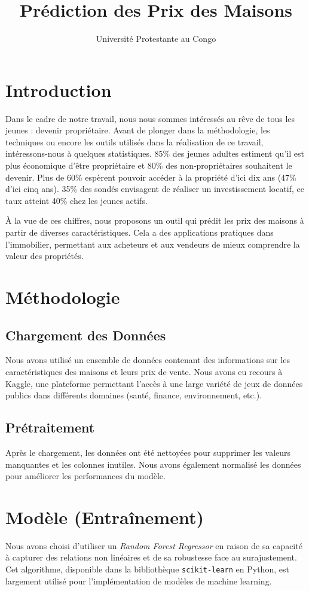 \documentclass{article}
\title{Prédiction des Prix des Maisons}
\author{Université Protestante au Congo}
\date{}
\begin{document}
 
\maketitle
 
\section{Introduction}
Dans le cadre de notre travail, nous nous sommes intéressés au rêve de tous les jeunes : devenir propriétaire. Avant de plonger dans la méthodologie, les techniques ou encore les outils utilisés dans la réalisation de ce travail, intéressons-nous à quelques statistiques. 85\% des jeunes adultes estiment qu’il est plus économique d’être propriétaire et 80\% des non-propriétaires souhaitent le devenir. Plus de 60\% espèrent pouvoir accéder à la propriété d’ici dix ans (47\% d’ici cinq ans). 35\% des sondés envisagent de réaliser un investissement locatif, ce taux atteint 40\% chez les jeunes actifs.
 
À la vue de ces chiffres, nous proposons un outil qui prédit les prix des maisons à partir de diverses caractéristiques. Cela a des applications pratiques dans l'immobilier, permettant aux acheteurs et aux vendeurs de mieux comprendre la valeur des propriétés.
 
\section{Méthodologie}
 
\subsection{Chargement des Données}
Nous avons utilisé un ensemble de données contenant des informations sur les caractéristiques des maisons et leurs prix de vente. Nous avons eu recours à Kaggle, une plateforme permettant l’accès à une large variété de jeux de données publics dans différents domaines (santé, finance, environnement, etc.).
 
\subsection{Prétraitement}
Après le chargement, les données ont été nettoyées pour supprimer les valeurs manquantes et les colonnes inutiles. Nous avons également normalisé les données pour améliorer les performances du modèle.
 
\section{Modèle (Entraînement)}
Nous avons choisi d'utiliser un \textit{Random Forest Regressor} en raison de sa capacité à capturer des relations non linéaires et de sa robustesse face au surajustement. Cet algorithme, disponible dans la bibliothèque \texttt{scikit-learn} en Python, est largement utilisé pour l’implémentation de modèles de machine learning.
 
\end{document}
